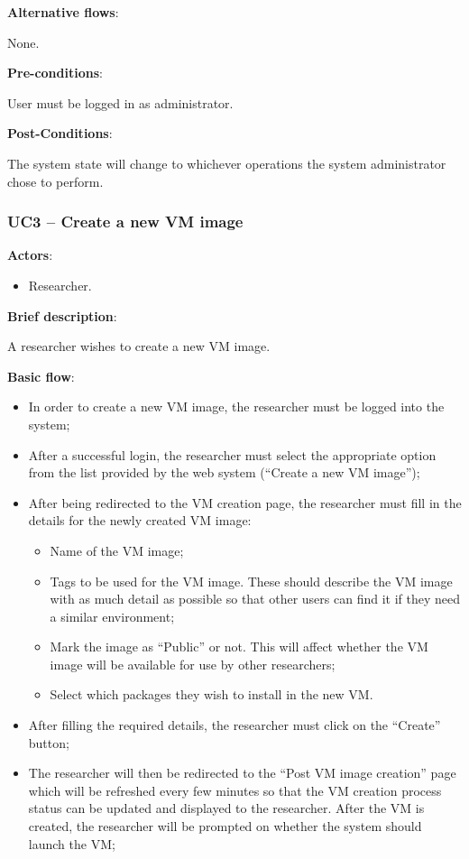 \textbf{Alternative flows}:

None.

\textbf{Pre-conditions}:

User must be logged in as administrator.

\textbf{Post-Conditions}:

The system state will change to whichever operations the system administrator chose to perform.

\subsubsection{UC3 -- Create a new VM image}\label{uc3}

\textbf{Actors}:

\begin{itemize}
\item Researcher.
\end{itemize}

\textbf{Brief description}:

A researcher wishes to create a new VM image.

\textbf{Basic flow}:

\begin{itemize}
\item In order to create a new VM image, the researcher must be logged into the system;
\item After a successful login, the researcher must select the appropriate option from the list provided by the web system (``Create a new VM image'');
\item After being redirected to the VM creation page, the researcher must fill in the details for the newly created VM image:
	\begin{itemize}
	\item Name of the VM image;
	\item Tags to be used for the VM image. These should describe the VM image with as much detail as possible so that other users can find it if they need a similar environment;
	\item Mark the image as ``Public'' or not. This will affect whether the VM image will be available for use by other researchers;
	\item Select which packages they wish to install in the new VM.
	\end{itemize}
\item After filling the required details, the researcher must click on the ``Create'' button;
\item The researcher will then be redirected to the ``Post VM image creation'' page which will be refreshed every few minutes so that the VM creation process status can be updated and displayed to the researcher. After the VM is created, the researcher will be prompted on whether the system should launch the VM;
\end{itemize}

